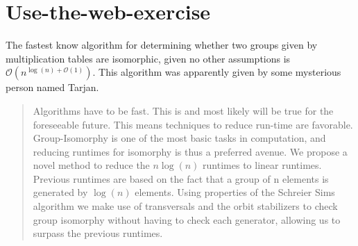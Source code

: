 \section{Use-the-web-exercise}

The fastest know algorithm for determining whether two groups given by multiplication tables are isomorphic, given no other assumptions is $\mathcal{O}(n^{\log(n)+\mathcal{O}(1)})$. This algorithm was apparently given by some mysterious person named Tarjan. \cite{miller1978n}

\begin{abstract}
Algorithms have to be fast. This is and most likely will be true for the foreseeable future. This means techniques to reduce run-time are favorable. Group-Isomorphy is one of the most basic tasks in computation, and reducing runtimes for isomorphy is thus a preferred avenue. We propose a novel method to reduce the $n\log(n)$ runtimes to linear runtimes. Previous runtimes are based on the fact that a group of n elements is generated by $\log(n)$ elements. Using properties of the Schreier Sims algorithm we make use of transversals and the orbit stabilizers to check group isomorphy without having to check each generator, allowing us to surpass the previous runtimes.
\end{abstract}
